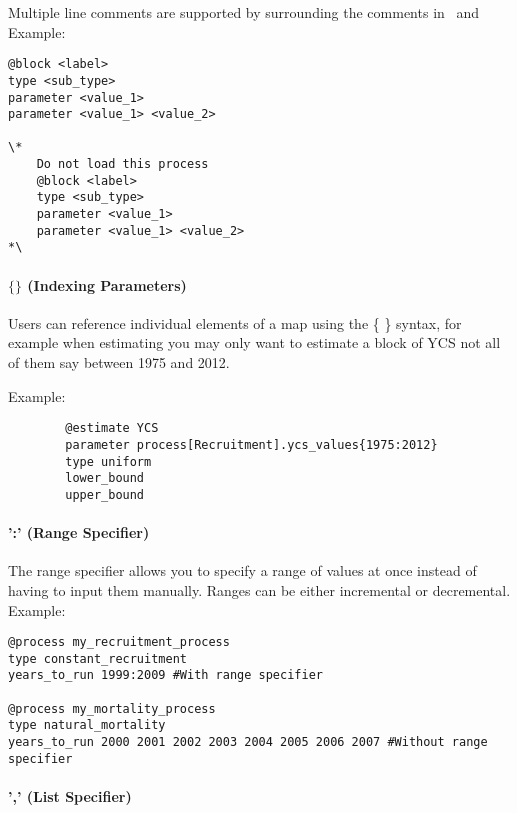Multiple line comments are supported by surrounding the comments in \commentstart\ and \commentend\\

Example:

{\small{\begin{verbatim}
@block <label>
type <sub_type>
parameter <value_1>
parameter <value_1> <value_2>

\*
	Do not load this process
	@block <label>
	type <sub_type>
	parameter <value_1>
	parameter <value_1> <value_2>
*\
\end{verbatim}}}

\paragraph*{$\{ \}$ (Indexing Parameters)}

Users can reference individual elements of a map using the \{ \} syntax, for example when estimating  you may only want to estimate a block of YCS not all of them say between 1975 and 2012.

Example:

{\small{\begin{verbatim}
		@estimate YCS
		parameter process[Recruitment].ycs_values{1975:2012}
		type uniform
		lower_bound
		upper_bound
		\end{verbatim}}}

\paragraph*{':' (Range Specifier)}

The range specifier allows you to specify a range of values at once instead of having to input them manually. Ranges can be either incremental or decremental.\\

Example:

{\small{\begin{verbatim}
@process my_recruitment_process
type constant_recruitment
years_to_run 1999:2009 #With range specifier

@process my_mortality_process
type natural_mortality
years_to_run 2000 2001 2002 2003 2004 2005 2006 2007 #Without range specifier
\end{verbatim}}}

\paragraph*{',' (List Specifier)}


